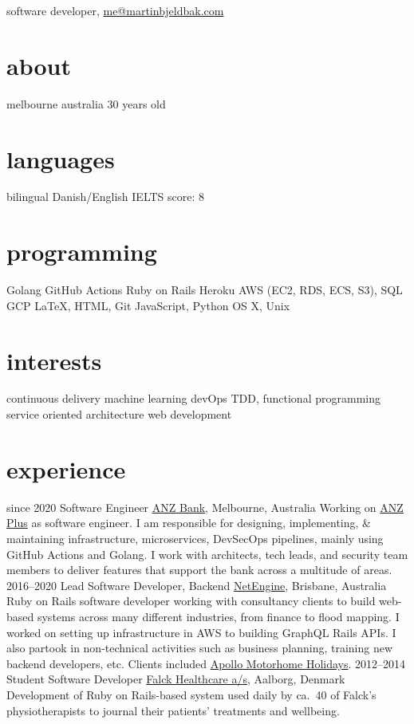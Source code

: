 \documentclass{afriggeri-cv/friggeri-cv}
\begin{document}
{software developer, \href{mailto:me@martinbjeldbak.com}{me@martinbjeldbak.com}}

\begin{aside}
  \section{about}
    melbourne
    australia
    \hfill
    30 years old
  \section{languages}
    bilingual Danish/English
    IELTS score: 8
  \section{programming}
    Golang
    GitHub Actions
    Ruby on Rails
    Heroku
    AWS (EC2, RDS, ECS, S3), SQL
    GCP
    \LaTeX, HTML, Git
    JavaScript, Python
    OS X, Unix
  \section{interests}
    continuous delivery
    machine learning
    devOps
    TDD, functional programming
    service oriented architecture
    web development
\end{aside}

\section{experience}

\begin{entrylist}
  \entry%
    {since 2020}
    {Software Engineer}
    {\href{https://www.anz.com.au}{ANZ Bank}, Melbourne, Australia}
    {Working on \href{https://www.anz.com.au/plus}{ANZ Plus} as software engineer.
    I am responsible for designing, implementing, \& maintaining infrastructure, microservices, DevSecOps pipelines, mainly using GitHub Actions and Golang. I work with architects, tech leads, and security team members to deliver features that support the bank across a multitude of areas.}
  \entry%
    {2016--2020}
    {Lead Software Developer, Backend}
    {\href{https://netengine.com.au/}{NetEngine}, Brisbane, Australia}
    {Ruby on Rails software developer working with consultancy clients to build web-based systems across
      many different industries, from finance to flood mapping. I worked on setting up infrastructure
      in AWS to building GraphQL Rails APIs.
      I also partook in non-technical activities such as business planning, training new backend developers,
      etc. Clients included \href{https://www.apollocamper.com}{Apollo Motorhome Holidays}.}
  \entry%
    {2012--2014}
    {Student Software Developer}
    {\href{https://www.falck.com/services/healthcare}{Falck Healthcare a/s}, Aalborg, Denmark}
    {Development of Ruby on Rails-based system used daily by ca.\ 40 of Falck's physiotherapists to journal their patients' treatments and wellbeing.}
\end{entrylist}
\end{document}
